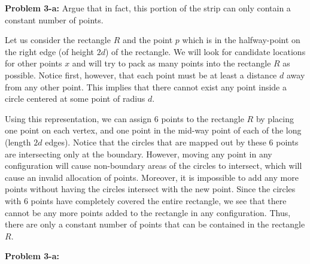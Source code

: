 \documentclass[psamsfonts]{amsart}
\newenvironment{sol}{\vspace{0.25cm}{\large \bfseries Solution:}}{\qedsymbol}
\newenvironment{prob}[1]{\begin{framed}{\large \bfseries Problem #1:}}{\end{framed}}
\begin{document}
\begin{prob}{3-a}
Argue that in fact, this portion of the strip can only contain a constant number of points.
\end{prob}
\begin{sol}
Let us consider the rectangle $R$ and the point $p$ which is in the halfway-point on the right edge (of height $2d$) of the rectangle. We will look for candidate locations for other points $x$ and will try to pack as many points into the rectangle $R$ as possible. Notice first, however, that each point must be at least a distance $d$ away from any other point. This implies that there cannot exist any point inside a circle centered at some point of radius $d$. 

Using this representation, we can assign 6 points to the rectangle $R$ by placing one point on each vertex, and one point in the mid-way point of each of the long (length $2d$ edges). Notice that the circles that are mapped out by these 6 points are intersecting only at the boundary. However, moving any point in any configuration will cause non-boundary areas of the circles to intersect, which will cause an invalid allocation of points. Moreover, it is impossible to add any more points without having the circles intersect with the new point. Since the circles with 6 points have completely covered the entire rectangle, we see that there cannot be any more points added to the rectangle in any configuration. Thus, there are only a constant number of points that can be contained in the rectangle $R$.
\end{sol}
\begin{prob}{3-a}
\end{prob}
\begin{sol}
\end{document}

